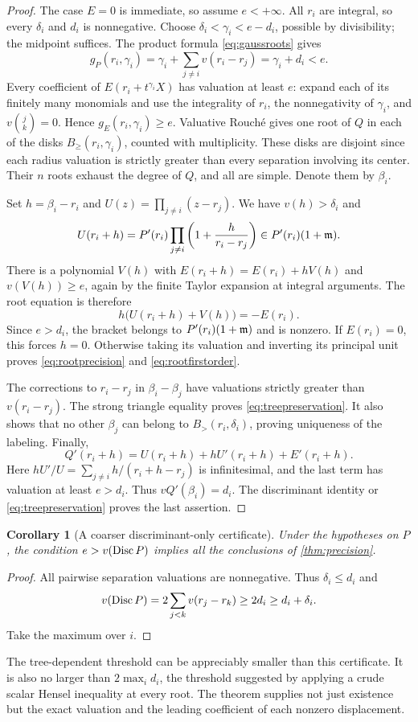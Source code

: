 \documentclass[11pt,letterpaper,oneside]{article}
\numberwithin{equation}{section}
\newtheorem{corollary}[theorem]{Corollary}
\theoremstyle{definition}
\theoremstyle{remark}\newtheorem{remark}[theorem]{Remark}
\newcommand{\Bcl}{B_{\geq}}\newcommand{\Bop}{B_{>}}
\begin{document}
\begin{proof}
The case $E=0$ is immediate, so assume $e<+\infty$.
All $r_i$ are integral, so every $\delta_i$ and $d_i$ is nonnegative.
Choose
$\delta_i<\gamma_i<e-d_i$, possible by divisibility; the midpoint
suffices. The product formula \eqref{eq:gaussroots} gives
\[
 g_P(r_i,\gamma_i)=\gamma_i+
 \sum_{j\ne i}v(r_i-r_j)=\gamma_i+d_i<e.
\]
Every coefficient of $E(r_i+t^{\gamma_i}X)$ has valuation at least $e$:
expand each of its finitely many monomials and use the integrality of
$r_i$, the nonnegativity of $\gamma_i$, and $v\binom{j}{k}=0$.
Hence $g_E(r_i,\gamma_i)\geq e$. Valuative Rouch\'e gives one root of
$Q$ in each of the disks $\Bcl(r_i,\gamma_i)$, counted with
multiplicity. These disks are disjoint since each radius valuation is
strictly greater than every separation involving its center. Their $n$
roots exhaust the degree of $Q$, and all are simple. Denote them by
$\beta_i$.

Set $h=\beta_i-r_i$ and
$U(z)=\prod_{j\ne i}(z-r_j)$. We have $v(h)>\delta_i$ and
\[
 U(r_i+h)=P'(r_i)
 \prod_{j\ne i}\left(1+\frac{h}{r_i-r_j}\right)
 \in P'(r_i)(1+\mathfrak m).
\]
There is a polynomial $V(h)$ with
$E(r_i+h)=E(r_i)+hV(h)$ and $v(V(h))\geq e$, again by the finite
Taylor expansion at integral arguments. The root equation is therefore
\begin{equation}\label{eq:displacementequation}
 h\bigl(U(r_i+h)+V(h)\bigr)=-E(r_i).
\end{equation}
Since $e>d_i$, the bracket belongs to $P'(r_i)(1+\mathfrak m)$ and is nonzero.
If $E(r_i)=0$, this forces $h=0$. Otherwise taking its valuation and
inverting its principal unit proves \eqref{eq:rootprecision} and
\eqref{eq:rootfirstorder}.

The corrections to $r_i-r_j$ in $\beta_i-\beta_j$ have valuations
strictly greater than $v(r_i-r_j)$. The strong triangle equality proves
\eqref{eq:treepreservation}. It also shows that no other $\beta_j$ can
belong to $\Bop(r_i,\delta_i)$, proving uniqueness of the labeling.
Finally,
\[
 Q'(r_i+h)=U(r_i+h)+hU'(r_i+h)+E'(r_i+h).
\]
Here $hU'/U=\sum_{j\ne i}h/(r_i+h-r_j)$ is infinitesimal, and the last
term has valuation at least $e>d_i$. Thus $vQ'(\beta_i)=d_i$.
The discriminant identity or \eqref{eq:treepreservation} proves the last
assertion.
\end{proof}

\begin{corollary}[A coarser discriminant-only certificate]\label{cor:disccertificate}
Under the hypotheses on $P$, the condition $e>v(\operatorname{Disc} P)$ implies all
the conclusions of \cref{thm:precision}.
\end{corollary}
\begin{proof}
All pairwise separation valuations are nonnegative. Thus
$\delta_i\leq d_i$ and
\[
 v(\operatorname{Disc} P)=2\sum_{j<k}v(r_j-r_k)\geq2d_i\geq d_i+\delta_i.
\]
Take the maximum over $i$.
\end{proof}
The tree-dependent threshold can be appreciably smaller than this
certificate. It is also no larger than $2\max_i d_i$, the threshold
suggested by applying a crude scalar Hensel inequality at every root.
The theorem supplies not just existence but the exact valuation and the
leading coefficient of each nonzero displacement.
\end{document}
